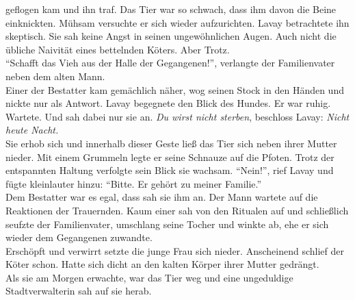 geflogen kam und ihn traf. Das Tier war so schwach, dass ihm davon die Beine einknickten. Mühsam 
versuchte er sich wieder aufzurichten. Lavay betrachtete ihn skeptisch. Sie sah keine Angst in 
seinen ungewöhnlichen Augen. Auch nicht die übliche Naivität eines bettelnden Köters. Aber 
Trotz.\\
``Schafft das Vieh aus der Halle der Gegangenen!'', verlangte der Familienvater neben dem alten 
Mann.\\
Einer der Bestatter kam gemächlich näher, wog seinen Stock in den Händen und nickte nur als 
Antwort. Lavay begegnete den Blick des Hundes. Er war ruhig. Wartete. Und sah dabei nur sie an.
\textit{Du wirst nicht sterben}, beschloss Lavay: \textit{Nicht heute Nacht.}\\
Sie erhob sich und innerhalb dieser Geste ließ das Tier sich neben ihrer Mutter nieder. Mit einem 
Grummeln legte er seine Schnauze auf die Pfoten. Trotz der entspannten Haltung verfolgte sein Blick 
sie wachsam. ``Nein!'', rief Lavay und fügte kleinlauter hinzu: ``Bitte. Er gehört zu meiner 
Familie.''\\
Dem Bestatter war es egal, dass sah sie ihm an. Der Mann wartete auf die Reaktionen der Trauernden. 
Kaum einer sah von den Ritualen auf und schließlich seufzte der Familienvater, umschlang seine 
Tocher und winkte ab, ehe er sich wieder dem Gegangenen zuwandte.\\
Erschöpft und verwirrt setzte die junge Frau sich nieder. Anscheinend schlief der Köter schon. 
Hatte sich dicht an den kalten Körper ihrer Mutter gedrängt.\\
Als sie am Morgen erwachte, war das Tier weg und eine ungeduldige Stadtverwalterin sah auf sie 
herab.\\


